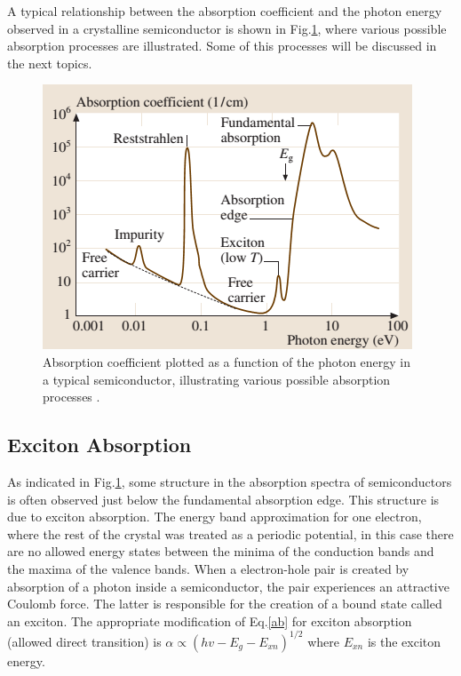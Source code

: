\documentclass[%
reprint,
amsmath,amssymb,
aps,
]{revtex4-1}
\begin{document}
	A typical relationship between the absorption coefficient and the photon energy observed in a crystalline semiconductor is shown in Fig.\ref{spectrum}, where various possible absorption processes are illustrated. Some of this processes will be discussed in the next topics.
	\begin{figure}[!h]
		\centering
		\includegraphics[scale=0.6]{Spectrumm.png}
		\caption{Absorption coefficient plotted as a function of
			the photon energy in a typical semiconductor, illustrating
			various possible absorption processes \cite{ch3}.
			\label{spectrum}}
	\end{figure}
	
	\subsection*{Exciton Absorption}
	As indicated in Fig.\ref{spectrum}, some structure in the absorption spectra of semiconductors is often observed just below the fundamental absorption edge. This structure is due to exciton absorption. The energy band approximation for one electron, where the rest of the crystal was treated as a periodic potential, in this case there are no allowed energy states between the minima of the conduction bands and the maxima of the valence bands. When a electron-hole pair is created by absorption of a photon inside a semiconductor, the pair experiences an attractive Coulomb force. The latter is responsible for the creation of a bound state called an exciton. The appropriate modification of Eq.\ref{ab} for exciton absorption (allowed direct transition) is $  \alpha \propto (hv - E_{g} - E_{xn})^{1/2 } $ where $ E_{xn} $ is the exciton energy.
	
\end{document}
